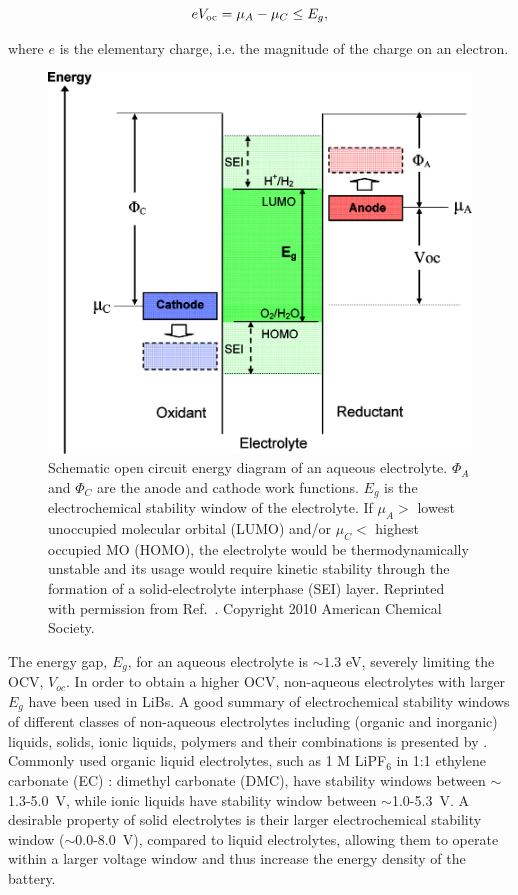 \documentclass[../main.tex]{subfiles}
\begin{document}
\begin{equation}
    eV_{\rm oc}=\mu_{A}-\mu_{C}\leq E_{g},
\end{equation}

where $e$ is the elementary charge, i.e. the magnitude of the charge on an electron.

\begin{figure}
    \centering
    \includegraphics{figures/electrolyte.jpeg}
    \caption{Schematic open circuit energy diagram of an aqueous electrolyte. $\Phi_{A}$ and $\Phi_{C}$ are the anode and cathode work functions. $E_{g}$ is the electrochemical stability window of the electrolyte. If $\mu_{A}>$ lowest unoccupied molecular orbital (LUMO) and/or $\mu_{C}<$ highest occupied MO (HOMO), the electrolyte would be thermodynamically unstable and its usage would require kinetic stability through the formation of a solid-electrolyte interphase (SEI) layer. Reprinted with permission from Ref.~. Copyright 2010 American Chemical Society.}
    \label{fig:electrolyte}
\end{figure}

The energy gap, $E_g$, for an aqueous electrolyte is $\sim1.3$ eV, severely limiting the OCV, $V_{oc}$. In order to obtain a higher OCV, non-aqueous electrolytes with larger $E_g$ have been used in LiBs.\cite{Xu2004, Goodenough2010} A good summary of electrochemical stability windows of different classes of non-aqueous electrolytes including (organic and inorganic) liquids, solids, ionic liquids, polymers and their combinations is presented by \citeauthor{Goodenough2010}.\cite{Goodenough2010} Commonly used organic liquid electrolytes, such as 1 M LiPF$_6$ in 1:1 ethylene carbonate (EC) : dimethyl carbonate (DMC), have stability windows between $\sim$1.3-5.0~V, while ionic liquids have stability window between $\sim$1.0-5.3~V. A desirable property of solid electrolytes is their larger electrochemical stability window ($\sim$0.0-8.0~V), compared to liquid electrolytes,\cite{Goodenough2010} allowing them to operate within a larger voltage window and thus increase the energy density of the battery.
\end{document}
